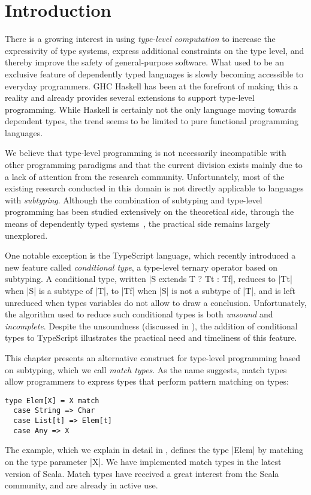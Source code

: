 \section{Introduction}
\label{sec:introduction}

There is a growing interest in using \emph{type-level computation} to increase the expressivity of type systems, express additional constraints on the type level, and thereby improve the safety of general-purpose software.
What used to be an exclusive feature of dependently typed languages is slowly becoming accessible to everyday programmers.
GHC Haskell has been at the forefront of making this a reality and already provides several extensions to support type-level programming.
While Haskell is certainly not the only language moving towards dependent types, the trend seems to be limited to pure functional programming languages.

We believe that type-level programming is not necessarily incompatible with other programming paradigms and that the current division exists mainly due to a lack of attention from the research community.
Unfortunately, most of the existing research conducted in this domain is not directly applicable to languages with \emph{subtyping}.
Although the combination of subtyping and type-level programming has been studied extensively on the theoretical side, through the means of dependently typed systems~\citep{aspinall1994subtyping, zwanenburg1999pure, stone2000deciding, courant2003strong, hutchins2010pure, yang2017unifying}, the practical side remains largely unexplored.

One notable exception is the TypeScript language, which recently introduced a new feature called \emph{conditional type}, a type-level ternary operator based on subtyping.
A conditional type, written |S extends T ? Tt : Tf|, reduces to |Tt| when |S| is a subtype of |T|, to |Tf| when |S| is not a subtype of |T|, and is left unreduced when types variables do not allow to draw a conclusion. Unfortunately, the algorithm used to reduce such conditional types is both \emph{unsound} and \emph{incomplete}.
Despite the unsoundness (discussed in ), the addition of conditional types to TypeScript illustrates the practical need and timeliness of this feature.

This chapter presents an alternative construct for type-level programming based on subtyping, which we call \emph{match types}.
As the name suggests, match types allow programmers to express types that perform pattern matching on types:
%
\begin{lstlisting}
type Elem[X] = X match
  case String => Char
  case List[t] => Elem[t]
  case Any => X
\end{lstlisting}
%
The example, which we explain in detail in , defines the type |Elem| by matching on the type parameter |X|.
%
We have implemented match types in the latest version of Scala.
Match types have received a great interest from the Scala community, and are already in active use.

